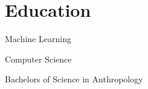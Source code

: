 \documentclass[letterpaper]{resume}
\begin{document}
\section{Education}

\begin{compactitem}[\null]
\item Machine Learning
\end{compactitem}

\begin{compactitem}[\null]
\item Computer Science
\end{compactitem}

\begin{compactitem}[\null]
\item Bachelors of Science in Anthropology
\end{compactitem}
\end{document}
